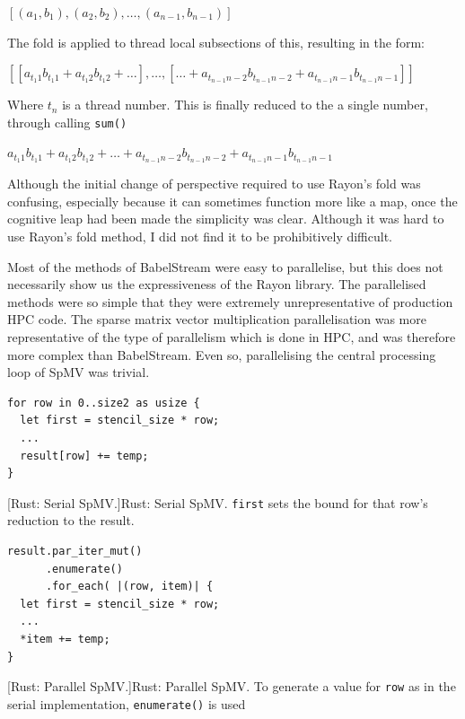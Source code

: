 \begin{center}
$[(a_1, b_1), (a_2, b_2), \ldots, (a_{n-1}, b_{n-1})]$
\end{center}

The fold is applied to thread local subsections of this, resulting in the form:

\begin{center}
$[ [a_{t_{1}1} b_{t_{1}1} + a_{t_{1}2}b_{t_{1}2} + \ldots ], \ldots ,[\ldots + a_{t_{n-1}{n-2}} b_{t_{n-1}{n-2}} + a_{t_{n-1}{n-1}} b_{t_{n-1}{n-1}}] ]$ 
\end{center}
Where $t_n$ is a thread number. This is finally reduced to the a single number, through calling \texttt{sum()}

\begin{center}
$a_{t_{1}1} b_{t_{1}1} + a_{t_{1}2}b_{t_{1}2} + \ldots + a_{t_{n-1}{n-2}} b_{t_{n-1}{n-2}} + a_{t_{n-1}{n-1}} b_{t_{n-1}{n-1}}$ 
\end{center}

Although the initial change of perspective required to use Rayon's fold was confusing, especially because it can sometimes function more like a map, once the cognitive leap had been made the simplicity was clear. Although it was hard to use Rayon's fold method, I did not find it to be prohibitively difficult.

Most of the methods of BabelStream were easy to parallelise, but this does not necessarily show us the expressiveness of the Rayon library. The parallelised methods were so simple that they were extremely unrepresentative of production HPC code. The sparse matrix vector multiplication parallelisation was more representative of the type of parallelism which is done in HPC, and was therefore more complex than BabelStream. Even so, parallelising the central processing loop of SpMV was trivial.
\noindent\begin{minipage}{.49\textwidth}
\begin{code}
\begin{verbatim}
for row in 0..size2 as usize {
  let first = stencil_size * row;
  ...
  result[row] += temp;
}
\end{verbatim}
[Rust: Serial SpMV.]{Rust: Serial SpMV. \texttt{first} sets the bound for that row's reduction to the result.}
\end{code}
\end{minipage}\hfill
\begin{minipage}{.49\textwidth}
\begin{code}
\begin{verbatim}
result.par_iter_mut()
      .enumerate()
      .for_each( |(row, item)| {
  let first = stencil_size * row;
  ...
  *item += temp;
}
\end{verbatim}
\label{lst:spmv-par}
[Rust: Parallel SpMV\@.]{Rust: Parallel SpMV\@. To generate a value for \texttt{row} as in the serial implementation, \texttt{enumerate()} is used}
\end{code}
\end{minipage}


